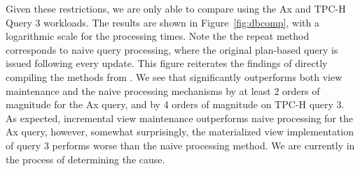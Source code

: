 Given these restrictions, we are only able to compare using the Ax and TPC-H
Query 3 workloads. The results are shown in Figure~\ref{fig:dbcomp}, with a
logarithmic scale for the processing times. Note the the repeat method
corresponds to naive query processing, where the original plan-based query is
issued following every update. This figure reiterates the findings of directly
compiling the methods from \compiler. We see that \compiler significantly
outperforms both view maintenance and the naive processing mechanisms by at
least 2 orders of magnitude for the Ax query, and by 4 orders of magnitude on
TPC-H query 3. As expected, incremental view maintenance outperforms naive
processing for the Ax query, however, somewhat surprisingly, the materialized
view implementation of query 3 performs worse than the naive processing
method. We are currently in the process of determining the cause.



